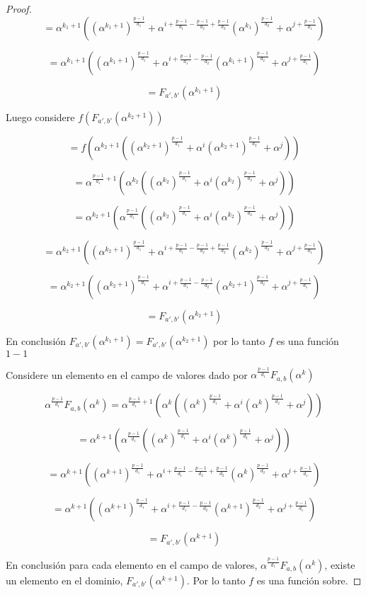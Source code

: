 \documentclass{article}
\theoremstyle{definition}
\theoremstyle{remark}
\numberwithin{equation}{section}
\begin{document}
\begin{proof}
  $$= \alpha^{k_1+1}((\alpha^{k_1+1})^{\frac{p-1}{d_1}} + \alpha^{i + \frac{p-1}{d_1} - \frac{p-1}{d_2} + \frac{p-1}{d_2}}(\alpha^{k_1})^{\frac{p-1}{d_2}} + \alpha^{j + \frac{p-1}{d_1}})$$

  $$= \alpha^{k_1+1}((\alpha^{k_1+1})^{\frac{p-1}{d_1}} + \alpha^{i + \frac{p-1}{d_1} - \frac{p-1}{d_2}}(\alpha^{k_1+1})^{\frac{p-1}{d_2}} + \alpha^{j + \frac{p-1}{d_1}})$$ 

  $$= F_{a', b'}(\alpha^{k_1+1})$$

  Luego considere $f(F_{a', b'}(\alpha^{k_2+1}))$

  $$= f(\alpha^{k_2+1}((\alpha^{k_2+1})^{\frac{p-1}{d_1}} + \alpha^{i}(\alpha^{k_2+1})^{\frac{p-1}{d_2}} + \alpha^{j}))$$

  $$ = \alpha^{\frac{p-1}{d_1}+1}(\alpha^{k_2}((\alpha^{k_2})^{\frac{p-1}{d_1}} + \alpha^{i}(\alpha^{k_2})^{\frac{p-1}{d_2}} + \alpha^{j}))$$

  $$ = \alpha^{k_2+1}(\alpha^{\frac{p-1}{d_1}}((\alpha^{k_2})^{\frac{p-1}{d_1}} + \alpha^{i}(\alpha^{k_2})^{\frac{p-1}{d_2}} + \alpha^{j}))$$

  $$ = \alpha^{k_2+1}((\alpha^{k_2 + 1})^{\frac{p-1}{d_1}} + \alpha^{i + \frac{p-1}{d_1} - \frac{p-1}{d_2} + \frac{p-1}{d_2}}(\alpha^{k_2})^{\frac{p-1}{d_2}} + \alpha^{j + \frac{p-1}{d_1}})$$

  $$= \alpha^{k_2+1}((\alpha^{k_2 + 1})^{\frac{p-1}{d_1}} + \alpha^{i + \frac{p-1}{d_1} - \frac{p-1}{d_2}}(\alpha^{k_2 + 1})^{\frac{p-1}{d_2}} + \alpha^{j + \frac{p-1}{d_1}})$$

  $$= F_{a', b'}(\alpha^{k_2+1})$$

  En conclusi\'on $F_{a', b'}(\alpha^{k_1+1}) = F_{a', b'}(\alpha^{k_2+1})$ por lo tanto $f$ es una funci\'on $1-1$

  Considere un elemento en el campo de valores dado por $\alpha^{\frac{p-1}{d_1}}F_{a, b}(\alpha^k)$

  $$\alpha^{\frac{p-1}{d_1}}F_{a, b}(\alpha^k) = \alpha^{\frac{p-1}{d_1}+1}(\alpha^{k}((\alpha^{k})^{\frac{p-1}{d_1}} + \alpha^{i}(\alpha^{k})^{\frac{p-1}{d_2}} + \alpha^{j}))$$

  $$ = \alpha^{k+1}(\alpha^{\frac{p-1}{d_1}}((\alpha^{k})^{\frac{p-1}{d_1}} + \alpha^{i}(\alpha^{k})^{\frac{p-1}{d_2}} + \alpha^{j}))$$

  $$ = \alpha^{k+1}((\alpha^{k + 1})^{\frac{p-1}{d_1}} + \alpha^{i + \frac{p-1}{d_1} - \frac{p-1}{d_2} + \frac{p-1}{d_2}}(\alpha^{k})^{\frac{p-1}{d_2}} + \alpha^{j + \frac{p-1}{d_1}})$$

  $$= \alpha^{k+1}((\alpha^{k + 1})^{\frac{p-1}{d_1}} + \alpha^{i + \frac{p-1}{d_1} - \frac{p-1}{d_2}}(\alpha^{k + 1})^{\frac{p-1}{d_2}} + \alpha^{j + \frac{p-1}{d_1}})$$

  $$= F_{a', b'}(\alpha^{k+1})$$

  En conclusi\'on para cada elemento en el campo de valores, $\alpha^{\frac{p-1}{d_1}}F_{a, b}(\alpha^k)$, existe un elemento en el dominio, $F_{a', b'}(\alpha^{k+1})$. Por lo tanto $f$ es una funci\'on sobre.

\end{proof}
\end{document}
